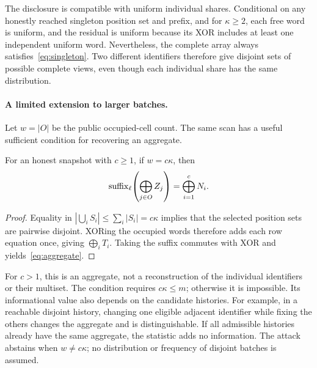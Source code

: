 The disclosure is compatible with uniform individual shares. Conditional on
any honestly reached singleton position set and prefix, and for $\kappa\geq2$,
each free word is uniform, and the residual is uniform because its XOR includes
at least one independent uniform word. Nevertheless, the complete array
always satisfies~\eqref{eq:singleton}. Two different identifiers therefore
give disjoint sets of possible complete views, even though each individual
share has the same distribution.

\paragraph{A limited extension to larger batches.}
Let $w=|O|$ be the public occupied-cell count. The same scan has a useful
sufficient condition for recovering an aggregate.

\begin{proposition}
\label{prop:disjoint}
For an honest snapshot with $c\geq1$, if $w=c\kappa$, then
\begin{equation}
 \operatorname{suffix}_\ell\!\left(\bigoplus_{j\in O}Z_j\right)
       =\bigoplus_{i=1}^{c}N_i.
 \label{eq:aggregate}
\end{equation}
\end{proposition}

\begin{proof}
Equality in
$|\bigcup_i S_i|\leq\sum_i|S_i|=c\kappa$ implies that the selected position
sets are pairwise disjoint. XORing the occupied words therefore adds each
row equation once, giving $\bigoplus_i T_i$. Taking the suffix commutes
with XOR and yields~\eqref{eq:aggregate}.
\end{proof}

For $c>1$, this is an aggregate, not a reconstruction of the individual
identifiers or their multiset. The condition requires $c\kappa\leq m$;
otherwise it is impossible. Its informational value also depends on the
candidate histories. For example, in a reachable disjoint history, changing
one eligible adjacent identifier while fixing the others changes the aggregate
and is distinguishable. If all admissible histories already have the same
aggregate, the statistic adds no information. The attack abstains when
$w\ne c\kappa$; no distribution or frequency of disjoint batches is assumed.

